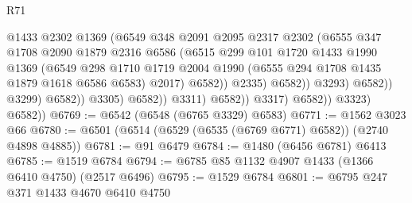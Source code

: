\begin{lexlean}{R71}
\begin{coremodule}
                                            @1433
                                            @2302
                                            @1369
                                            (@6549
                                              @348
                                              @2091
                                              @2095
                                              @2317
                                              @2302
                                              (@6555
                                                @347
                                                @1708
                                                @2090
                                                @1879
                                                @2316
                                                @6586
                                                (@6515
                                                  @299
                                                  @101
                                                  @1720
                                                  @1433
                                                  @1990
                                                  @1369
                                                  (@6549
                                                    @298
                                                    @1710
                                                    @1719
                                                    @2004
                                                    @1990
                                                    (@6555 @294 @1708 @1435 @1879 @1618 @6586 @6583)
                                                    @2017)
                                                  @6582))
                                              @2335)
                                            @6582))
                                        @3293)
                                      @6582))
                                  @3299)
                                @6582))
                            @3305)
                          @6582))
                      @3311)
                    @6582))
                @3317)
              @6582))
          @3323)
        @6582))
@6769 := @6542 (@6548 (@6765 @3329) @6583)
@6771 := @1562 @3023 @66
@6780 := @6501 (@6514 (@6529 (@6535 (@6769 @6771) @6582)) (@2740 @4898 @4885))
@6781 := @91 @6479
@6784 := @1480 (@6456 @6781) @6413
@6785 := @1519 @6784
@6794 := @6785 @85 @1132 @4907 @1433 (@1366 @6410 @4750) (@2517 @6496)
@6795 := @1529 @6784
@6801 := @6795 @247 @371 @1433 @4670 @6410 @4750

\end{coremodule}
\end{lexlean}

